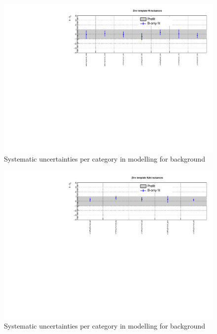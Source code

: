 \clearpage
\begin{figure}[h!]
  \centering
  \caption{Systematic uncertainties per \scalht category in \mht modelling for \znunuj background}
  \includegraphics[width=1.\linewidth]{figures/results/36invfb/postfit/nuis/TemplateZinv_ht_nuisances}
\end{figure}

\begin{figure}[h!]
  \centering
  \caption{Systematic uncertainties per \njet category in \mht modelling for \znunuj background}
  \includegraphics[width=1.\linewidth]{figures/results/36invfb/postfit/nuis/TemplateZinv_njet_nuisances}
\end{figure}

